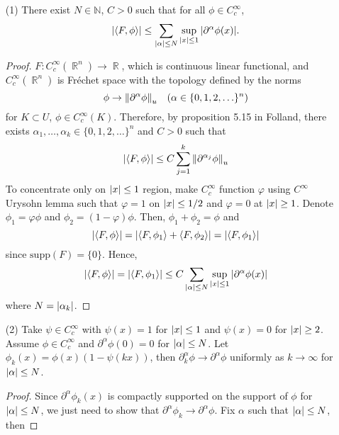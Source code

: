 \documentclass{article}
\DeclareMathOperator{\rr}{\mathbb{R}}
\begin{document}
\begin{enumerate}
\item[(1)] There exist $N\in \mathbb{N}$, $C>0$ such that for all $\phi\in C_c^\infty$,
\begin{equation}
\abs{\langle F,\phi\rangle}\leq \sum\limits_{\abs{\alpha}\leq N}\sup\limits_{\abs{x}\leq 1}\abs{\partial^\alpha \phi(x)}.
\end{equation}
\begin{proof}
$F:C^\infty_c(\rr^n)\rightarrow\rr$, which is continuous linear functional, and $C^\infty_c(\rr^n)$ is Fr\'echet space with the topology defined by the norms
\begin{equation*}
\phi\rightarrow \norm{\partial^\alpha \phi}_u~~~(\alpha\in\{0,1,2,\ldots\}^n)
\end{equation*}
for $K\subset U$, $\phi\in C_c^\infty (K)$. Therefore, by proposition 5.15 in Folland, there exists $\alpha_1,\ldots, \alpha_k\in\{0,1,2,\ldots\}^n$ and $C>0$ such that
\begin{equation*}
\abs{\langle F,\phi\rangle}\leq C\sum\limits_{j=1}^k \norm{\partial^{\alpha_j}\phi}_u
\end{equation*}
To concentrate only on $\abs{x}\leq 1$ region, make $C_c^\infty$ function $\varphi$ using $C^\infty$ Urysohn lemma such that $\varphi=1$ on $\abs{x}\leq 1/2$ and $\varphi=0$ at $\abs{x}\geq 1$. Denote $\phi_1=\varphi\phi$ and $\phi_2=(1-\varphi)\phi$. Then, $\phi_1+\phi_2=\phi$ and
\begin{equation*}
\abs{\langle F,\phi\rangle}=\abs{\langle F,\phi_1\rangle+\langle F,\phi_2\rangle}=\abs{\langle F,\phi_1\rangle}
\end{equation*}
since $\text{supp}(F)=\{0\}$. Hence,
\begin{equation*}
\abs{\langle F,\phi\rangle}=\abs{\langle F,\phi_1\rangle}\leq C\sum\limits_{\abs{\alpha}\leq N}\sup\limits_{\abs{x}\leq 1}\abs{\partial^\alpha\phi(x)}
\end{equation*}
where $N=\abs{\alpha_k}$.
\end{proof}
\item[(2)]Take $\psi\in C_c^\infty$ with $\psi(x)=1$ for $\abs{x}\leq 1$ and $\psi(x)=0$ for $\abs{x}\geq 2$. Assume $\phi\in C_c^\infty$ and $\partial^\alpha\phi(0)=0$ for $\abs{\alpha}\leq N$. Let $\phi_k(x)=\phi(x)(1-\psi(kx))$, then $\partial^\alpha_k\phi\rightarrow\partial^\alpha\phi$ uniformly as $k\rightarrow \infty$ for $\abs{\alpha}\leq N$.
\begin{proof}
Since $\partial^\alpha\phi_k(x)$ is compactly supported on the support of $\phi$ for $\abs{\alpha}\leq N$, we just need to show that $\partial^\alpha\phi_k\rightarrow\partial^\alpha \phi$. Fix $\alpha$ such that $\abs{\alpha}\leq N$, then

\end{proof}
\end{enumerate}
\end{document}
